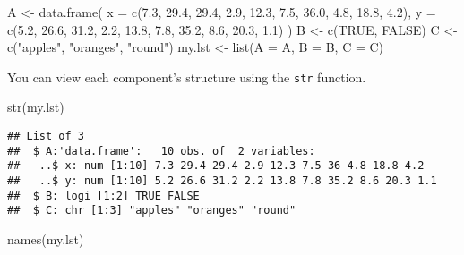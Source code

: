 \documentclass[
]{article}
\newenvironment{Shaded}{\begin{snugshade}}{\end{snugshade}}
\newcommand{\AttributeTok}[1]{\textcolor[rgb]{0.77,0.63,0.00}{#1}}
\newcommand{\ConstantTok}[1]{\textcolor[rgb]{0.00,0.00,0.00}{#1}}
\newcommand{\FloatTok}[1]{\textcolor[rgb]{0.00,0.00,0.81}{#1}}
\newcommand{\FunctionTok}[1]{\textcolor[rgb]{0.00,0.00,0.00}{#1}}
\newcommand{\NormalTok}[1]{#1}
\newcommand{\OtherTok}[1]{\textcolor[rgb]{0.56,0.35,0.01}{#1}}
\newcommand{\StringTok}[1]{\textcolor[rgb]{0.31,0.60,0.02}{#1}}
\begin{document}
\begin{Shaded}
\begin{Highlighting}[]
\NormalTok{A }\OtherTok{\textless{}{-}} \FunctionTok{data.frame}\NormalTok{(}
     \AttributeTok{x =} \FunctionTok{c}\NormalTok{(}\FloatTok{7.3}\NormalTok{, }\FloatTok{29.4}\NormalTok{, }\FloatTok{29.4}\NormalTok{, }\FloatTok{2.9}\NormalTok{, }\FloatTok{12.3}\NormalTok{, }\FloatTok{7.5}\NormalTok{, }\FloatTok{36.0}\NormalTok{, }\FloatTok{4.8}\NormalTok{, }\FloatTok{18.8}\NormalTok{, }\FloatTok{4.2}\NormalTok{),}
     \AttributeTok{y =} \FunctionTok{c}\NormalTok{(}\FloatTok{5.2}\NormalTok{, }\FloatTok{26.6}\NormalTok{, }\FloatTok{31.2}\NormalTok{, }\FloatTok{2.2}\NormalTok{, }\FloatTok{13.8}\NormalTok{, }\FloatTok{7.8}\NormalTok{, }\FloatTok{35.2}\NormalTok{, }\FloatTok{8.6}\NormalTok{, }\FloatTok{20.3}\NormalTok{, }\FloatTok{1.1}\NormalTok{) )}
\NormalTok{B }\OtherTok{\textless{}{-}} \FunctionTok{c}\NormalTok{(}\ConstantTok{TRUE}\NormalTok{, }\ConstantTok{FALSE}\NormalTok{)}
\NormalTok{C }\OtherTok{\textless{}{-}} \FunctionTok{c}\NormalTok{(}\StringTok{"apples"}\NormalTok{, }\StringTok{"oranges"}\NormalTok{, }\StringTok{"round"}\NormalTok{)}
\NormalTok{my.lst }\OtherTok{\textless{}{-}} \FunctionTok{list}\NormalTok{(}\AttributeTok{A =}\NormalTok{ A, }\AttributeTok{B =}\NormalTok{ B, }\AttributeTok{C =}\NormalTok{ C)}
\end{Highlighting}
\end{Shaded}

You can view each component's structure using the \texttt{str} function.

\begin{Shaded}
\begin{Highlighting}[]
\FunctionTok{str}\NormalTok{(my.lst)}
\end{Highlighting}
\end{Shaded}

\begin{verbatim}
## List of 3
##  $ A:'data.frame':   10 obs. of  2 variables:
##   ..$ x: num [1:10] 7.3 29.4 29.4 2.9 12.3 7.5 36 4.8 18.8 4.2
##   ..$ y: num [1:10] 5.2 26.6 31.2 2.2 13.8 7.8 35.2 8.6 20.3 1.1
##  $ B: logi [1:2] TRUE FALSE
##  $ C: chr [1:3] "apples" "oranges" "round"
\end{verbatim}

\begin{Shaded}
\begin{Highlighting}[]
\FunctionTok{names}\NormalTok{(my.lst)}
\end{Highlighting}
\end{Shaded}
\end{document}
